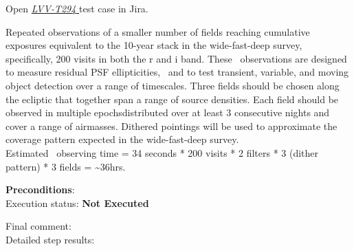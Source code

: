 \documentclass[DM,lsstdraft,STR,toc]{lsstdoc}
\begin{document}
Open  \href{https://jira.lsstcorp.org/secure/Tests.jspa#/testCase/LVV-T294}{\textit{ LVV-T294 } }
test case in Jira.

    Repeated observations of a smaller number of fields reaching cumulative
exposures equivalent to the 10-year stack in the wide-fast-deep survey,
specifically, 200 visits in both the r and i band. These ~observations
are designed to measure residual PSF ellipticities, ~and to test
transient, variable, and moving object detection over a range of
timescales. Three fields should be chosen along the ecliptic that
together span a range of source densities. Each field should be observed
in multiple epochsdistributed over at least 3 consecutive nights and
cover a range of airmasses. Dithered pointings will be used to
approximate the coverage pattern expected in the wide-fast-deep
survey.\\[2\baselineskip]Estimated ~observing time = 34 seconds * 200
visits * 2 filters * 3 (dither pattern) * 3 fields =
\textasciitilde{}36hrs.


    \textbf{ Preconditions}:\\
    

    Execution status: {\bf Not Executed }

    Final comment:\\


    Detailed step results:
\end{document}
